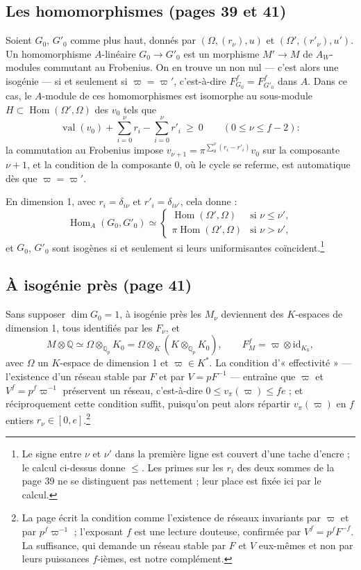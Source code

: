 \documentclass[11pt,a4paper]{article}
\begin{document}
\subsection*{Les homomorphismes (pages 39 et 41)}

Soient $G_{0}$, $G'_{0}$ comme plus haut, donnés par $(\Omega, (r_{\nu}), u)$
et $(\Omega', (r'_{\nu}), u')$. Un homomorphisme $A$-linéaire $G_{0} \to
G'_{0}$ est un morphisme $M' \to M$ de $A_{W}$-modules commutant au
Frobenius. On en trouve un non nul — c'est alors une isogénie — si et
seulement si $\varpi = \varpi'$, c'est-à-dire $F_{G_{0}}^{f} =
F_{G'_{0}}^{f}$ dans $A$. Dans ce cas, le $A$-module de ces homomorphismes
est isomorphe au sous-module $H \subset \operatorname{Hom}(\Omega', \Omega)$
des $v_{0}$ tels que
\[
\operatorname{val}(v_{0}) + \sum_{i=0}^{\nu} r_{i} - \sum_{i=0}^{\nu} r'_{i}
\ \ge\ 0 \qquad (0 \le \nu \le f-2) :
\]
la commutation au Frobenius impose $v_{\nu+1} = \pi^{\sum_{0}^{\nu}(r_{i} -
r'_{i})}v_{0}$ sur la composante $\nu+1$, et la condition de la composante
0, où le cycle se referme, est automatique dès que $\varpi = \varpi'$.

En dimension 1, avec $r_{i} = \delta_{i\nu}$ et $r'_{i} = \delta_{i\nu'}$,
cela donne :
\[
\operatorname{Hom}_{A}(G_{0}, G'_{0}) \simeq
\begin{cases}
\operatorname{Hom}(\Omega', \Omega) & \text{si } \nu \le \nu', \\
\pi\operatorname{Hom}(\Omega', \Omega) & \text{si } \nu > \nu',
\end{cases}
\]
et $G_{0}$, $G'_{0}$ sont isogènes si et seulement si leurs uniformisantes
coïncident.\footnote{Le signe entre $\nu$ et $\nu'$ dans la première ligne
est couvert d'une tache d'encre ; le calcul ci-dessus donne $\le$. Les primes
sur les $r_{i}$ des deux sommes de la page 39 ne se distinguent pas
nettement ; leur place est fixée ici par le calcul.}

\subsection*{À isogénie près (page 41)}

Sans supposer $\dim G_{0} = 1$, à isogénie près les $M_{\nu}$ deviennent des
$K$-espaces de dimension 1, tous identifiés par les $F_{\nu}$, et
\[
M \otimes \mathbb{Q} \simeq \Omega \otimes_{\mathbb{Q}_{p}} K_{0} =
\Omega \otimes_{K} (K \otimes_{\mathbb{Q}_{p}} K_{0}), \qquad
F_{M}^{f} = \varpi \otimes \mathrm{id}_{K_{0}},
\]
avec $\Omega$ un $K$-espace de dimension 1 et $\varpi \in K^{*}$. La
condition d'« effectivité » — l'existence d'un réseau stable par $F$ et par
$V = pF^{-1}$ — entraîne que $\varpi$ et $V^{f} = p^{f}\varpi^{-1}$
préservent un réseau, c'est-à-dire $0 \le v_{\pi}(\varpi) \le fe$ ; et
réciproquement cette condition suffit, puisqu'on peut alors répartir
$v_{\pi}(\varpi)$ en $f$ entiers $r_{\nu} \in [0, e]$.\footnote{La page écrit
la condition comme l'existence de réseaux invariants par $\varpi$ et par
$p^{f}\varpi^{-1}$ ; l'exposant $f$ est une lecture douteuse, confirmée par
$V^{f} = p^{f}F^{-f}$. La suffisance, qui demande un réseau stable par $F$ et
$V$ eux-mêmes et non par leurs puissances $f$-ièmes, est notre complément.}
\end{document}
